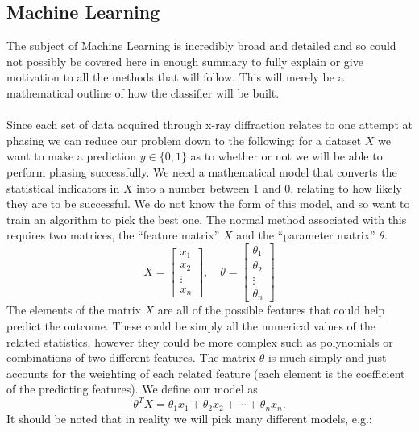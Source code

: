 \documentclass[11pt, a4paper]{article}
\begin{document}
\begin{multicols}{2}
\subsection{Machine Learning}
The subject of Machine Learning is incredibly broad and detailed and so could not possibly be covered here in enough summary to fully explain or give motivation to all the methods that will follow. This will merely be a mathematical outline of how the classifier will be built. 
\\
\\Since each set of data acquired through x-ray diffraction relates to one attempt at phasing we can reduce our problem down to the following: for a dataset $X$ we want to make a prediction $y \in \{0,1\}$ as to whether or not we will be able to perform phasing successfully. We need a mathematical model that converts the statistical indicators in $X$ into a number between 1 and 0, relating to how likely they are to be successful. We do not know the form of this model, and so want to train an algorithm to pick the best one. The normal method associated with this requires two matrices, the ``feature matrix'' $X$ and the ``parameter matrix'' $\theta$.
\begin{equation*}
X = \begin{bmatrix} x_1 \\ x_2 \\ \vdots \\ x_n \end{bmatrix}, \quad 
\theta = \begin{bmatrix} \theta_1 \\ \theta_2 \\ \vdots \\ \theta_n \end{bmatrix}
\end{equation*}
The elements of the matrix $X$ are all of the possible features that could help predict the outcome. These could be simply all the numerical values of the related statistics, however they could be more complex such as polynomials or combinations of two different features. The matrix $\theta$ is much simply and just accounts for the weighting of each related feature (each element is the coefficient of the predicting features). We define our model as
\begin{equation*}
\theta^T X = \theta_1 x_1 + \theta_2 x_2 + \cdots + \theta_n x_n.
\end{equation*}
It should be noted that in reality we will pick many different models, e.g.:
\begin{itemize}

\end{itemize}
\end{multicols}
\end{document}
